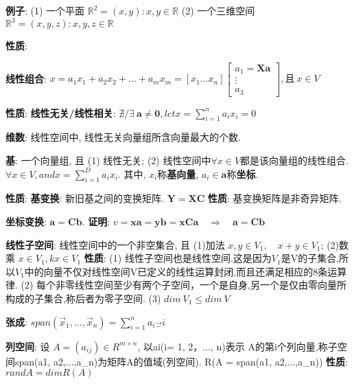 \documentclass{article}
\newcommand{\bb}{\boldsymbol}
\begin{document}
            \textbf{例子}:
                (1) 一个平面 $\mathbb R^2 = {(x,y): x, y\in \mathbb R}$
                (2) 一个三维空间 $\mathbb R^3 = {(x,y,z): x, y, z\in \mathbb R}$

            \textbf{性质}:


        \textbf{线性组合}: $x = a_1 x_1 +a_2 x_2+ ... +a_m x_m = [x_1 ... x_n] \begin{bmatrix} a_1 = \bb X \bb a\\ \vdots \\ a_3 \end{bmatrix}, \text{且}\ x \in V$

            \textbf{性质}: 
                \textbf{线性无关/线性相关}: $\nexists / \exists\ \bb a \neq \bb 0, let x = \sum\limits_{i=1}^n a_i x_i = 0$ 

        \textbf{维数}: 线性空间中, 线性无关向量组所含向量最大的个数.
        
        \textbf{基}: 一个向量组, 且 (1) 线性无关; (2) 线性空间中$\forall x \in V$都是该向量组的线性组合. $\forall x \in V, and x = \sum\limits_{i=1}^{D} a_i x_i$. 其中, $x_i$称\textbf{基向量}, $a_i \in \bb a$称\textbf{坐标}.

            \textbf{性质}: 
                \textbf{基变换}: 新旧基之间的变换矩阵. $\bb Y = \bb X \bb C$
                    \textbf{性质}: 基变换矩阵是非奇异矩阵.

                \textbf{坐标变换}: $\bb a = \bb C \bb b$.
                    \textbf{证明}: $v = \bb x \bb a = \bb y \bb b = \bb x \bb C \bb a \quad \Rightarrow \quad \bb a = \bb C \bb b$

            
        \textbf{线性子空间}: 线性空间中的一个非空集合, 且 (1)加法 $x,y\in V_1 ,\quad x+y \in V_1$; (2)数乘 $x \in V_1, k x \in V_1$
            \textbf{性质}: 
                (1) 线性子空间也是线性空间.这是因为$V_1$是V的子集合,所以$V_1$中的向量不仅对线性空间V已定义的线性运算封闭,而且还满足相应的8条运算律.
                (2) 每个非零线性空间至少有两个子空间，一个是自身,另一个是仅由零向量所构成的子集合,称后者为零子空间.             
                (3) $dim\ V_1 \le dim\ V$

        \textbf{张成}: $span(\vec x_1,...,\vec x_n ) = {\sum_{i=1}^n a_i \vec_i}$ 
            
        \textbf{列空间}: 设 $A = (a_{ij})\in R^{m×n}$, 以ai(i= 1, 2，..., n)表示
        A的第i个列向量,称子空间span(a1, a2,...,a_n)为矩阵A的值域(列空间). R(A = span(a1, a2,...,a_n))
            \textbf{性质}: $rand A = dim R(A)$
\end{document}
